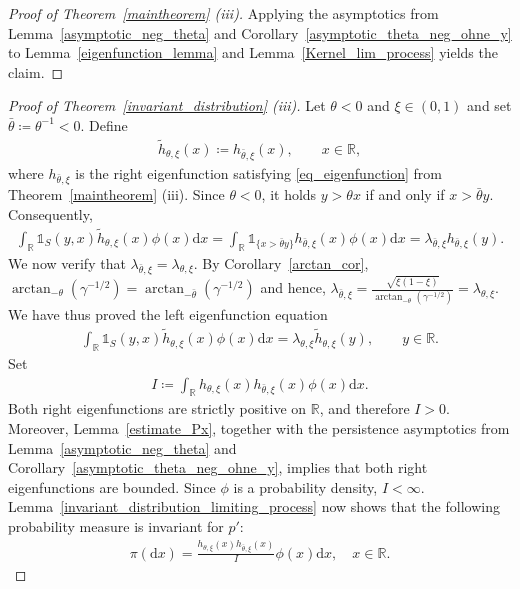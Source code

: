 \documentclass[10pt,a4paper]{amsart}
\newcommand{\R}{\mathbb{R}} %
\newcommand{\1}{\mathds{1}}
\renewcommand{\d}{\mathrm{d}}
\begin{document}
\begin{proof}[Proof of Theorem~\ref{maintheorem} (iii)]
Applying the asymptotics from Lemma~\ref{asymptotic_neg_theta} and Corollary~\ref{asymptotic_theta_neg_ohne_y} to Lemma~\ref{eigenfunction_lemma} and Lemma~\ref{Kernel_lim_process} yields the claim.
\end{proof}
\begin{proof}[Proof of Theorem~\ref{invariant_distribution} (iii)]
Let $\theta<0$ and $\xi\in(0,1)$ and set $\bar\theta\coloneqq \theta^{-1}<0$. Define 
\begin{align*} 
\tilde h_{\theta,\xi}(x) \coloneqq h_{\bar\theta,\xi}(x), \qquad x\in\R,
\end{align*}
where $h_{\bar\theta,\xi}$ is the right eigenfunction satisfying \eqref{eq_eigenfunction} from Theorem~\ref{maintheorem} (iii).
Since $\theta<0$, it holds $ y>\theta x $ if and only if $ x>\bar\theta y $. Consequently, 
\begin{align*} 
\int_\R \mathds{1}_S(y,x) \tilde h_{\theta,\xi}(x) \phi(x)\d x 
= \int_\R \mathds{1}_{\{x>\bar\theta y\}} h_{\bar\theta,\xi}(x) \phi(x)\d x
= \lambda_{\bar\theta ,\xi} h_{\bar\theta ,\xi}(y). 
\end{align*} 
We now verify that $ \lambda_{\bar\theta ,\xi} = \lambda_{\theta,\xi}$. By Corollary~\ref{arctan_cor}, $ \arctan_{-\theta}(\gamma^{-1/2}) = \arctan_{-\bar\theta}(\gamma^{-1/2})$ and hence, $ \lambda_{\bar\theta ,\xi} = \frac{ \sqrt{\xi(1-\xi)} }{ \arctan_{-\theta}(\gamma^{-1/2}) }=\lambda_{\theta,\xi}$. We have thus proved the left eigenfunction equation 
\begin{align*} 
\int_\R \mathds{1}_S(y,x) \tilde h_{\theta,\xi}(x) \phi(x)\d x = \lambda_{\theta,\xi} \tilde h_{\theta,\xi}(y), \qquad y\in\R. 
\end{align*} 
Set 
\begin{align*}
I  \coloneqq \int_\R h_{\theta,\xi}(x) h_{\bar\theta ,\xi}(x) \phi(x)\d x.
\end{align*} 
Both right eigenfunctions are strictly positive on $\R$, and therefore $ I >0$. Moreover, Lemma~\ref{estimate_Px}, together with the persistence asymptotics from Lemma~\ref{asymptotic_neg_theta} and Corollary~\ref{asymptotic_theta_neg_ohne_y}, implies that both right eigenfunctions are bounded. Since $\phi$ is a probability density, $ I <\infty$. Lemma~\ref{invariant_distribution_limiting_process} now shows that the following probability measure is invariant for $p'$:
\begin{align*} 
\pi (\d x) = \frac{ h_{\theta,\xi}(x) h_{\bar\theta ,\xi}(x) }{I} \phi(x)\d x, \quad x\in\R.
\end{align*} 



\end{proof}
\end{document}
